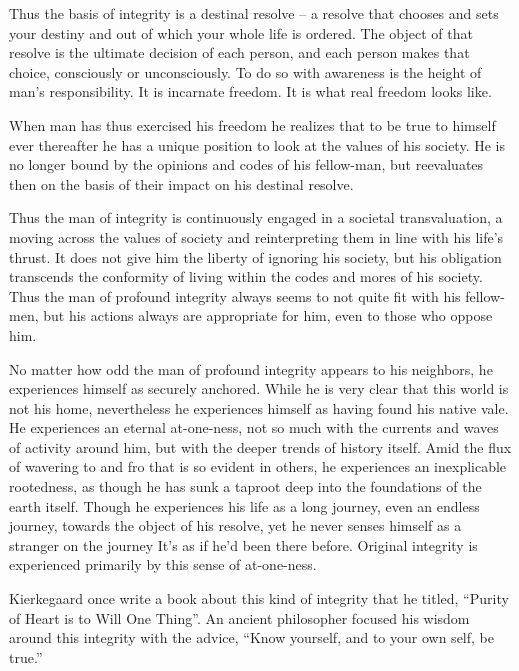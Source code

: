 \begin{footnotesize}
\begin{sffamily}
Thus the basis of integrity is a destinal resolve -- a resolve that chooses and sets your destiny and out of which your whole life is ordered. The object of that resolve is the ultimate decision of each person, and each person makes that choice, consciously or unconsciously. To do so with awareness is the height of man's responsibility. It is incarnate freedom. It is what real freedom looks like.

When man has thus exercised his freedom he realizes that to be true to himself ever thereafter he has a unique position to look at the values of his society. He is no longer bound by the opinions and codes of his fellow-man, but reevaluates then on the basis of their impact on his destinal resolve.

Thus the man of integrity is continuously engaged in a societal transvaluation, a moving across the values of society and reinterpreting them in line with his life's thrust. It does not give him the liberty of ignoring his society, but his obligation transcends the conformity of living within the codes and mores of his society. Thus the man of profound integrity always seems to not quite fit with his fellow-men, but his actions always are appropriate for him, even to those who oppose him.

No matter how odd the man of profound integrity appears to his neighbors, he experiences himself as securely anchored. While he is very clear that this world is not his home, nevertheless he experiences himself as having found his native vale. He experiences an eternal at-one-ness, not so much with the currents and waves of activity around him, but with the deeper trends of history itself. Amid the flux of wavering to and fro that is so evident in others, he experiences an inexplicable rootedness, as though he has sunk a taproot deep into the foundations of the earth itself. Though he experiences his life as a long journey, even an endless journey, towards the object of his resolve, yet he never senses himself as a stranger on the journey It's as if he'd been there before. Original integrity is experienced primarily by this sense of at-one-ness.

Kierkegaard once write a book about this kind of integrity that he titled, ``Purity of Heart is to Will One Thing''. An ancient philosopher focused his wisdom around this integrity with the advice, ``Know yourself, and to your own self, be true.''

\end{sffamily}
\end{footnotesize}

